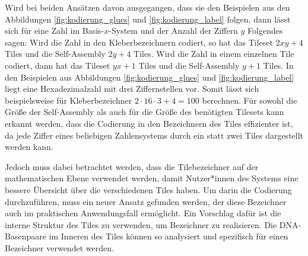 Wird bei beiden Ansätzen davon ausgegangen, dass sie den Beispielen aus den Abbildungen \ref{fig:kodierung_glues} und \ref{fig:kodierung_label} folgen, dann lässt sich für eine Zahl im Basis-$x$-System und der Anzahl der Ziffern $y$ Folgendes sagen:
Wird die Zahl in den Kleberbezeichnern codiert, so hat das Tileset $2xy + 4$ Tiles und die Self-Assembly $2y+4$ Tiles.
Wird die Zahl in einem einzelnen Tile codiert, dann hat das Tileset $yx+1$ Tiles und die Self-Assembly $y+1$ Tiles.
In den Beispielen aus Abbildungen \ref{fig:kodierung_glues} und \ref{fig:kodierung_label} liegt eine Hexadezimalzahl mit drei Ziffernstellen vor. Somit lässt sich beispielsweise für Kleberbezeichner $2\cdot 16\cdot 3+4 = 100$ berechnen.
Für sowohl die Größe der Self-Assembly als auch für die Größe des benötigten Tilesets kann erkannt werden, dass die Codierung in den Bezeichnern des Tiles effizienter ist, da jede Ziffer eines beliebigen Zahlensystems durch ein statt zwei Tiles dargestellt werden kann.

Jedoch muss dabei betrachtet werden, dass die Tilebezeichner auf der mathematischen Ebene verwendet werden, damit Nutzer*innen des Systems eine bessere Übersicht über die verschiedenen Tiles haben. 
Um darin die Codierung durchzuführen, muss ein neuer Ansatz gefunden werden, der diese Bezeichner auch im praktischen Anwendungsfall ermöglicht. 
Ein Vorschlag dafür ist die interne Struktur des Tiles zu verwenden, um Bezeichner zu realisieren. 
Die DNA-Basenpaare im Inneren des Tiles können so analysiert und spezifisch für einen Bezeichner verwendet werden.

